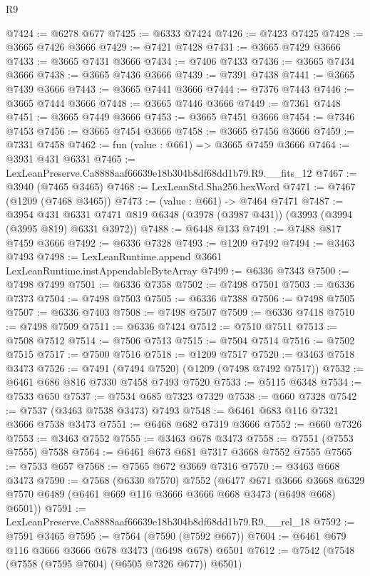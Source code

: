 \begin{lexlean}{R9}
\begin{coremodule}
@7424 := @6278 @677
@7425 := @6333 @7424
@7426 := @7423 @7425
@7428 := @3665 @7426 @3666
@7429 := @7421 @7428
@7431 := @3665 @7429 @3666
@7433 := @3665 @7431 @3666
@7434 := @7406 @7433
@7436 := @3665 @7434 @3666
@7438 := @3665 @7436 @3666
@7439 := @7391 @7438
@7441 := @3665 @7439 @3666
@7443 := @3665 @7441 @3666
@7444 := @7376 @7443
@7446 := @3665 @7444 @3666
@7448 := @3665 @7446 @3666
@7449 := @7361 @7448
@7451 := @3665 @7449 @3666
@7453 := @3665 @7451 @3666
@7454 := @7346 @7453
@7456 := @3665 @7454 @3666
@7458 := @3665 @7456 @3666
@7459 := @7331 @7458
@7462 := fun (value : @661) => @3665 @7459 @3666
@7464 := @3931 @431 @6331
@7465 := LexLeanPreserve.Ca8888aaf66639e18b304b8df68dd1b79.R9.__fits_12
@7467 := @3940 (@7465 @3465)
@7468 := LexLeanStd.Sha256.hexWord
@7471 := @7467 (@1209 (@7468 @3465))
@7473 := (value : @661) -> @7464 @7471
@7487 := @3954
    @431
    @6331
    @7471
    @819
    @6348
    (@3978 (@3987 @431))
    (@3993 (@3994 (@3995 @819) @6331 @3972))
@7488 := @6448 @133
@7491 := @7488 @817 @7459 @3666
@7492 := @6336 @7328
@7493 := @1209 @7492
@7494 := @3463 @7493
@7498 := LexLeanRuntime.append @3661 LexLeanRuntime.instAppendableByteArray
@7499 := @6336 @7343
@7500 := @7498 @7499
@7501 := @6336 @7358
@7502 := @7498 @7501
@7503 := @6336 @7373
@7504 := @7498 @7503
@7505 := @6336 @7388
@7506 := @7498 @7505
@7507 := @6336 @7403
@7508 := @7498 @7507
@7509 := @6336 @7418
@7510 := @7498 @7509
@7511 := @6336 @7424
@7512 := @7510 @7511
@7513 := @7508 @7512
@7514 := @7506 @7513
@7515 := @7504 @7514
@7516 := @7502 @7515
@7517 := @7500 @7516
@7518 := @1209 @7517
@7520 := @3463 @7518 @3473
@7526 := @7491 (@7494 @7520) (@1209 (@7498 @7492 @7517))
@7532 := @6461 @686 @816 @7330 @7458 @7493 @7520
@7533 := @5115 @6348
@7534 := @7533 @650
@7537 := @7534 @685 @7323 @7329
@7538 := @660 @7328
@7542 := @7537 (@3463 @7538 @3473) @7493
@7548 := @6461 @683 @116 @7321 @3666 @7538 @3473
@7551 := @6468 @682 @7319 @3666
@7552 := @660 @7326
@7553 := @3463 @7552
@7555 := @3463 @678 @3473
@7558 := @7551 (@7553 @7555) @7538
@7564 := @6461 @673 @681 @7317 @3668 @7552 @7555
@7565 := @7533 @657
@7568 := @7565 @672 @3669 @7316
@7570 := @3463 @668 @3473
@7590 := @7568
    (@6330 @7570)
    @7552
    (@6477
      @671
      @3666
      @3668
      @6329
      @7570
      @6489
      (@6461 @669 @116 @3666 @3666 @668 @3473 (@6498 @668) @6501))
@7591 := LexLeanPreserve.Ca8888aaf66639e18b304b8df68dd1b79.R9.__rel_18
@7592 := @7591 @3465
@7595 := @7564 (@7590 (@7592 @667))
@7604 := @6461 @679 @116 @3666 @3666 @678 @3473 (@6498 @678) @6501
@7612 := @7542 (@7548 (@7558 (@7595 @7604) (@6505 @7326 @677)) @6501)

\end{coremodule}
\end{lexlean}
